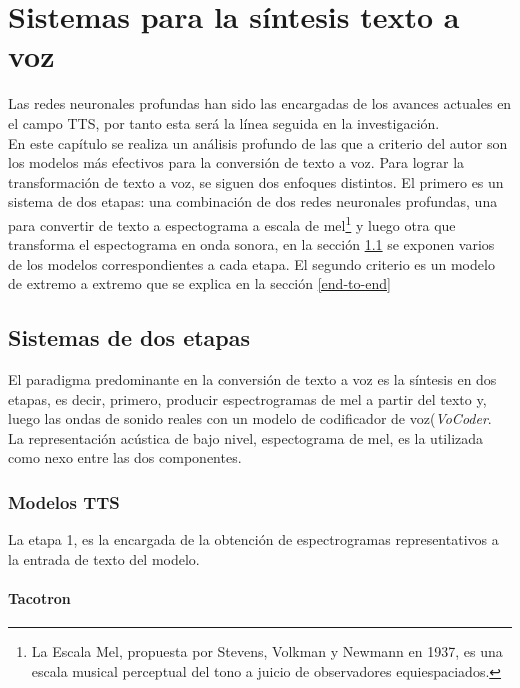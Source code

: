 \chapter{Sistemas para la síntesis texto a voz}\label{chapter:state-of-the-art}

Las redes neuronales profundas han sido las encargadas de los avances actuales en el campo TTS, por tanto esta será la línea seguida en la investigación. \\

En este capítulo se realiza un análisis profundo de las que a criterio del autor son los modelos más efectivos para la conversión de texto a voz. Para lograr la transformación de texto a voz, se siguen dos enfoques distintos. El primero es un sistema de dos etapas: una combinación de dos redes neuronales profundas, una para convertir de texto a espectograma a escala de mel\footnote{La Escala Mel, propuesta por Stevens, Volkman y Newmann en 1937, es una escala musical perceptual del tono a juicio de observadores equiespaciados.} y luego otra que transforma el espectograma en onda sonora, en la sección \ref{two-stages} se exponen varios de los modelos correspondientes a cada etapa. El segundo criterio es un modelo de extremo a extremo que se explica en la sección \ref{end-to-end}

\section{Sistemas de dos etapas} \label{two-stages}

El paradigma predominante en la conversión de texto a voz es la síntesis en dos etapas, es decir, primero, producir espectrogramas de mel a partir del texto y, luego las ondas de sonido reales con un modelo de codificador de voz(\textit{VoCoder}. La representación acústica de bajo nivel, espectograma de mel, es la utilizada como nexo entre las dos componentes.


\subsection{Modelos TTS}
La etapa 1, es la encargada de la obtención de espectrogramas representativos a la entrada de texto del modelo. 

\subsubsection{Tacotron}

